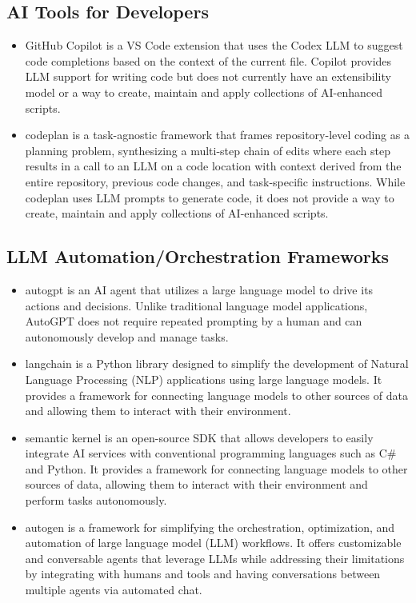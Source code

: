 \subsection{AI Tools for Developers}

\begin{itemize}
\item GitHub Copilot is a VS Code extension that uses the Codex LLM to suggest code completions based on the context of the current file. Copilot provides LLM support for writing code but does not currently have an extensibility model or a way to create, maintain and apply collections of AI-enhanced scripts.
\item codeplan is a task-agnostic framework that frames repository-level coding as a planning problem, synthesizing a multi-step chain of edits where each step results in a call to an LLM on a code location with context derived from the entire repository, previous code changes, and task-specific instructions. While codeplan uses LLM prompts to generate code, it does not provide a way to create, maintain and apply collections of AI-enhanced scripts.
\end{itemize}

\subsection{LLM Automation/Orchestration Frameworks}

\begin{itemize}
\item autogpt is an AI agent that utilizes a large language model to drive its actions and decisions. Unlike traditional language model applications, AutoGPT does not require repeated prompting by a human and can autonomously develop and manage tasks.
\item langchain is a Python library designed to simplify the development of Natural Language Processing (NLP) applications using large language models. It provides a framework for connecting language models to other sources of data and allowing them to interact with their environment.
\item semantic kernel is an open-source SDK that allows developers to easily integrate AI services with conventional programming languages such as C\# and Python. It provides a framework for connecting language models to other sources of data, allowing them to interact with their environment and perform tasks autonomously.
\item autogen is a framework for simplifying the orchestration, optimization, and automation of large language model (LLM) workflows. It offers customizable and conversable agents that leverage LLMs while addressing their limitations by integrating with humans and tools and having conversations between multiple agents via automated chat.
\end{itemize}

